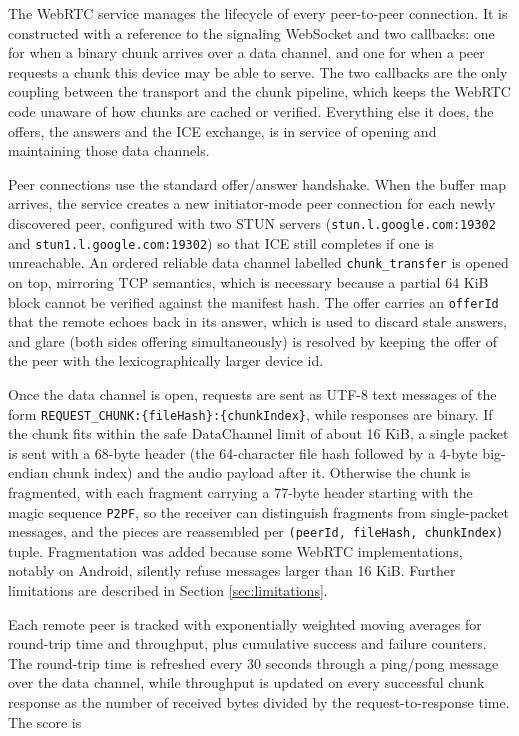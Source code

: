 \indent \par The WebRTC service manages the lifecycle of every peer-to-peer connection. It is constructed with a reference to the signaling WebSocket and two callbacks: one for when a binary chunk arrives over a data channel, and one for when a peer requests a chunk this device may be able to serve. The two callbacks are the only coupling between the transport and the chunk pipeline, which keeps the WebRTC code unaware of how chunks are cached or verified. Everything else it does, the offers, the answers and the ICE exchange, is in service of opening and maintaining those data channels.

\indent \par Peer connections use the standard offer/answer handshake. When the buffer map arrives, the service creates a new initiator-mode peer connection for each newly discovered peer, configured with two STUN servers (\texttt{stun.l.google.com:19302} and \texttt{stun1.l.google.com:19302}) so that ICE still completes if one is unreachable. An ordered reliable data channel labelled \texttt{chunk\_transfer} is opened on top, mirroring TCP semantics, which is necessary because a partial 64 KiB block cannot be verified against the manifest hash. The offer carries an \texttt{offerId} that the remote echoes back in its answer, which is used to discard stale answers, and glare (both sides offering simultaneously) is resolved by keeping the offer of the peer with the lexicographically larger device id.

\par Once the data channel is open, requests are sent as UTF-8 text messages of the form \texttt{REQUEST\_CHUNK:\{fileHash\}:\{chunkIndex\}}, while responses are binary. If the chunk fits within the safe DataChannel limit of about 16 KiB, a single packet is sent with a 68-byte header (the 64-character file hash followed by a 4-byte big-endian chunk index) and the audio payload after it. Otherwise the chunk is fragmented, with each fragment carrying a 77-byte header starting with the magic sequence \texttt{P2PF}, so the receiver can distinguish fragments from single-packet messages, and the pieces are reassembled per \texttt{(peerId, fileHash, chunkIndex)} tuple. Fragmentation was added because some WebRTC implementations, notably on Android, silently refuse messages larger than 16 KiB. Further limitations are described in Section \ref{sec:limitations}.

\indent \par Each remote peer is tracked with exponentially weighted moving averages for round-trip time and throughput, plus cumulative success and failure counters. The round-trip time is refreshed every 30 seconds through a ping/pong message over the data channel, while throughput is updated on every successful chunk response as the number of received bytes divided by the request-to-response time. The score is

